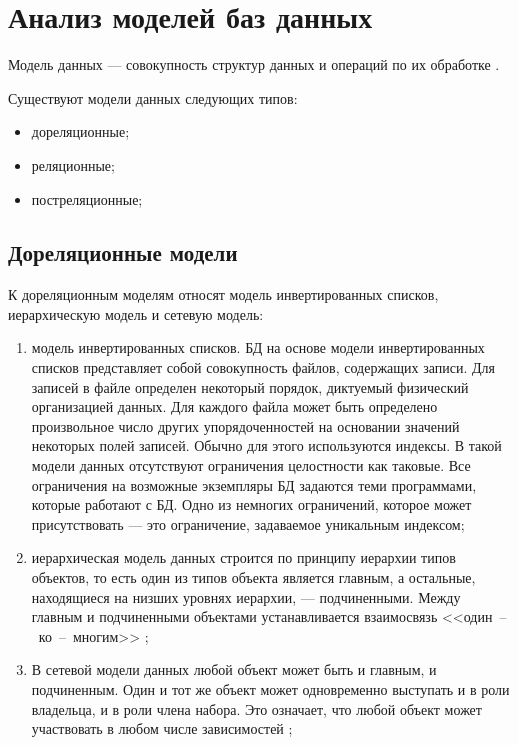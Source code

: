 \section{Анализ моделей баз данных}
Модель данных --- совокупность структур данных и операций по их обработке \cite{dbms}.

Существуют модели данных следующих типов:
\begin{itemize}
	\item дореляционные;
	\item реляционные;
	\item постреляционные;
\end{itemize}

\subsection{Дореляционные модели}
К дореляционным моделям относят модель инвертированных списков, иерархическую модель и сетевую модель:

\begin{enumerate}
	\item модель инвертированных списков.
	БД на основе модели инвертированных списков представляет собой совокупность файлов, содержащих записи.
	Для записей в файле определен некоторый порядок, диктуемый физический организацией данных.
	Для каждого файла может быть определено произвольное число других упорядоченностей на основании значений некоторых полей записей.
	Обычно для этого используются индексы.
	В такой модели данных отсутствуют ограничения целостности как таковые.
	Все ограничения на возможные экземпляры БД задаются теми программами, которые работают с БД.
	Одно из немногих ограничений, которое может присутствовать --- это ограничение, задаваемое уникальным индексом;
	
	\item иерархическая модель данных строится по принципу иерархии типов объектов, то есть один из типов объекта является главным, а остальные, находящиеся на низших уровнях иерархии, --- подчиненными.
	Между главным и подчиненными объектами устанавливается взаимосвязь <<один~--~ко~--~многим>> \cite{dbms};
	
	\item В сетевой модели данных любой объект может быть и главным, и подчиненным.
	Один и тот же объект может одновременно выступать и в роли владельца, и в роли члена набора.
	Это означает, что любой объект может участвовать в любом числе зависимостей \cite{dbms};	
\end{enumerate}


